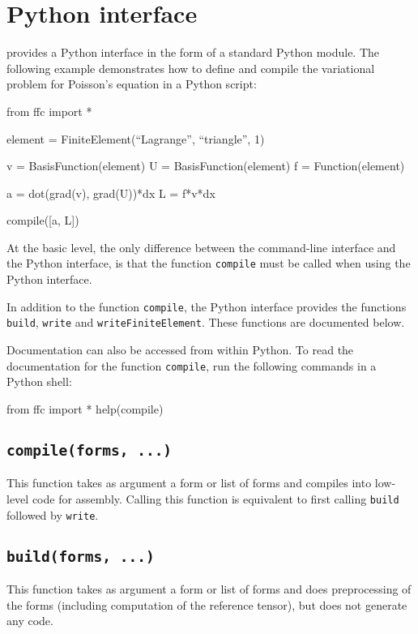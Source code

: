 \chapter{Python interface}

\ffc{} provides a Python interface in the form of a standard
Python module. The following example demonstrates how to define and
compile the variational problem for Poisson's equation in a Python
script:

\begin{code}
 from ffc import *

 element = FiniteElement(``Lagrange'', ``triangle'', 1)

 v = BasisFunction(element)
 U = BasisFunction(element)
 f = Function(element)
  
 a = dot(grad(v), grad(U))*dx
 L = f*v*dx

 compile([a, L])
\end{code}

At the basic level, the only difference between the command-line
interface and the Python interface, is that the function
\texttt{compile} must be called when using the Python interface.

In addition to the function \texttt{compile}, the Python interface
provides the functions \texttt{build}, \texttt{write} and
\texttt{writeFiniteElement}. These functions are documented below.

Documentation can also be accessed from within Python. To read the
documentation for the function \texttt{compile}, run the following
commands in a Python shell:

\begin{code}
 from ffc import *
 help(compile)
\end{code}

\section{\texttt{compile(forms, ...)}}

This function takes as argument a form or list of forms
and compiles into low-level code for assembly. Calling this function
is equivalent to first calling \texttt{build} followed by
\texttt{write}.

\section{\texttt{build(forms, ...)}}

This function takes as argument a form or list of forms
and does preprocessing of the forms (including computation of the
reference tensor), but does not generate any code.


